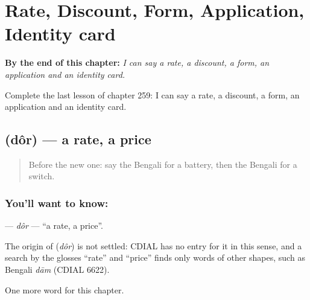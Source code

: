
\chapter{Rate, Discount, Form, Application, Identity card}
\label{ch:bn-rate-discount-form-application-identity-card}

\begin{chapteropening}
\textbf{By the end of this chapter:} \emph{I can say a rate, a discount, a form, an application and an identity card.}

Complete the last lesson of chapter 259: I can say a rate, a discount, a form, an application and an identity card.
\end{chapteropening}

\section[\texorpdfstring{\bn{দর} (dôr)}{দর (dôr)}]{ (dôr) — a rate, a price}

\label{lesson:BN-C259-dor}



\begin{quote}
Before the new one: say the Bengali for a battery, then the Bengali for a switch.
\end{quote}

\subsection*{You'll want to know: }
\textbf{} — \emph{dôr} — \textquotedblleft{}a rate, a price\textquotedblright{}.

\begin{cousinweb}
The origin of \textbf{} (\emph{dôr}) is not settled: CDIAL has no entry for it in this sense, and a search by the glosses \textquotedblleft{}rate\textquotedblright{} and \textquotedblleft{}price\textquotedblright{} finds only words of other shapes, such as Bengali \emph{dām} (CDIAL 6622).
\end{cousinweb}

\begin{grammarlens}[title={What you've built}]
One more word for this chapter.
\end{grammarlens}

